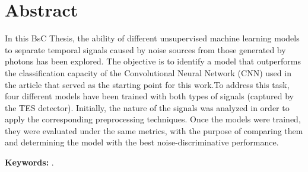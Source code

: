 %
%
%
% 
%
%
%
%

\chapter*{Abstract}
\label{cha:abstract}


In this BsC Thesis, the ability of different unsupervised machine learning models to separate temporal signals caused by noise sources from those generated by photons has been explored. The objective is to identify a model that outperforms the classification capacity of the Convolutional Neural Network (CNN) used in the article that served as the starting point for this work.To address this task, four different models have been trained with both types of signals (captured by the TES detector). Initially, the nature of the signals was analyzed in order to apply the corresponding preprocessing techniques. Once the models were trained, they were evaluated under the same metrics, with the purpose of comparing them and determining the model with the best noise-discriminative performance.

\textbf{Keywords:} \myThesisKeywordsEnglish.



